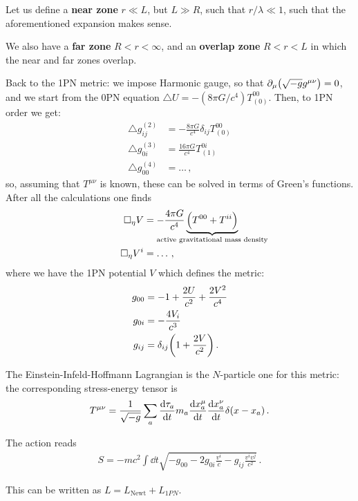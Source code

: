 \documentclass[main.tex]{subfiles}
\begin{document}
Let us define a \textbf{near zone} \(r \ll L\), but \(L \gg R\), such that \(r / \lambda \ll 1\), such that the aforementioned expansion makes sense. 

We also have a \textbf{far zone} \(R < r < \infty \), and an \textbf{overlap zone} \(R < r < L\) in which the near and far zones overlap. 

Back to the 1PN metric: we impose Harmonic gauge, so that \(\partial_{\mu } \qty(\sqrt{-g} g^{\mu \nu }) = 0\), and we start from the 0PN equation \(\triangle U = - (8 \pi G/c^{4}) T^{00}_{(0)}\). 
Then, to 1PN order we get: 
%
\begin{align}
\triangle g_{ij}^{(2)} &= - \frac{8\pi G}{c^{4}} \delta_{ij} T^{00}_{(0)}  \\
\triangle g_{0i}^{(3)} &= \frac{16 \pi G}{c^{4}} T^{0i}_{(1)}  \\
\triangle g_{00}^{(4)} &= \dots
\,,
\end{align}
%
so, assuming that \(T^{\mu \nu }\) is known, these can be solved in terms of Green's functions. 
After all the calculations one finds 
%
\begin{align}
\square_\eta V &= - \frac{4 \pi G}{c^{4}} \underbrace{\qty(T^{00} + T^{ii})}_{\mathclap{\text{active gravitational mass density}}}  \\
\square_\eta V^{i} &= \dots
\,,
\end{align}
%
where we have  the 1PN potential \(V\) which defines the metric: 
%
\begin{align}
g_{00} &= -1 + \frac{2U}{c^2} + \frac{2 V^2}{c^{4}}  \\
g_{0i} &= - \frac{4 V_{i}}{c^3}  \\
g_{ij} &= \delta_{ij} \qty(1 + \frac{2 V}{c^2})
\,.
\end{align}

The Einstein-Infeld-Hoffmann Lagrangian is the \(N\)-particle one for this metric: the corresponding stress-energy tensor is
%
\begin{align}
T^{\mu \nu } = \frac{1}{\sqrt{-g}} \sum _a \dv{\tau_a}{t} m_a \dv{x_a^{\mu }}{t} \dv{x^{\nu }_a}{t} \delta (x - x_a)
\,.
\end{align}

The action reads 
%
\begin{align}
S = - mc^2 \int \dd{t} \sqrt{- g_{00} -2 g_{0i} \frac{v^{i}}{c} - g_{ij} \frac{v^{i} v^{j}}{c^2}} 
\,.
\end{align}

This can be written as \(L= L _{\text{Newt}} + L_{1PN}\). 
\end{document}
